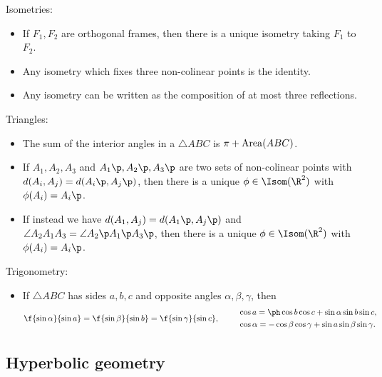 Isometries:
\begin{itemize}
	\shortskip
	\item If $F_1, F_2$ are orthogonal frames, then there is a unique isometry taking $F_1$ to $F_2$.
	\item Any isometry which fixes three non-colinear points is the identity.
	\item Any isometry can be written as the composition of at most three reflections.
\end{itemize}

Triangles:
\begin{itemize}
	\shortskip
	\item The sum of the interior angles in a $\triangle ABC$ is $\pi+\operatorname{Area}(ABC)$.
	\item If $A_1,A_2,A_3$ and $A_1\p,A_2\p,A_3\p$ are two sets of non-colinear points with $d(A_i,A_j) = d(A_i\p,A_j\p)$, then there is a unique $\phi\in\Isom(\R^2)$ with $\phi(A_i) = A_i\p$. %
	\item If instead we have $d(A_1,A_j) = d(A_1\p,A_j\p)$ and $\angle A_2 A_1 A_3 = \angle A_2\p A_1\p A_3\p$, then there is a unique $\phi\in\Isom(\R^2)$ with $\phi(A_i) = A_i\p$. %
\end{itemize}

Trigonometry:
\begin{itemize}
	\item If $\triangle ABC$ has sides $a,b,c$ and opposite angles $\alpha,\beta,\gamma$, then
	\begin{equation*}
		\f{\sin \alpha}{\sin a} = \f{\sin \beta}{\sin b} = \f{\sin\gamma}{\sin c}, \qquad
		\begin{array}{l}
			\cos a = \ph \cos b \cos c + \sin \alpha \sin b \sin c, \\[3pt]
			\cos\alpha = -\cos\beta \cos \gamma + \sin a \sin \beta\sin\gamma.
		\end{array}
	\end{equation*}
\end{itemize}


	\pagebreak

\subsection{Hyperbolic geometry} %
\label{sub:hyperbolic_geometry}

